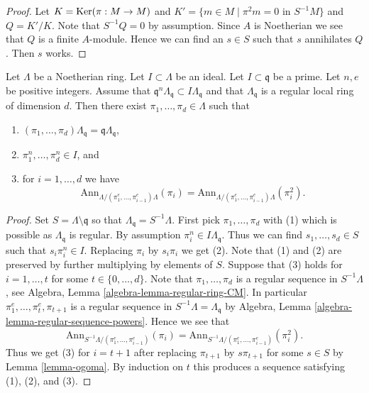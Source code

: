 \begin{proof}
Let $K = \mathop{\mathrm{Ker}}(\pi : M \to M)$ and
$K' = \{m \in M \mid \pi^2 m = 0\text{ in }S^{-1}M\}$ and
$Q = K'/K$. Note that $S^{-1}Q = 0$ by assumption. Since $A$
is Noetherian we see that $Q$ is a finite $A$-module.
Hence we can find an $s \in S$ such that $s$ annihilates $Q$.
Then $s$ works.
\end{proof}

\begin{lemma}
\label{lemma-find-sequence}
Let $\Lambda$ be a Noetherian ring. Let $I \subset \Lambda$ be an ideal.
Let $I \subset \mathfrak q$ be a prime. Let $n, e$ be positive integers.
Assume that $\mathfrak q^n\Lambda_\mathfrak q \subset I\Lambda_\mathfrak q$
and that $\Lambda_\mathfrak q$ is a regular local ring of dimension $d$.
Then there exist
$\pi_1, \ldots, \pi_d \in \Lambda$ such that
\begin{enumerate}
\item $(\pi_1, \ldots, \pi_d)\Lambda_\mathfrak q =
\mathfrak q\Lambda_\mathfrak q$,
\item $\pi_1^n, \ldots, \pi_d^n \in I$, and
\item for $i = 1, \ldots, d$ we have
$$
\text{Ann}_{\Lambda/(\pi_1^e, \ldots, \pi_{i - 1}^e)\Lambda}(\pi_i) =
\text{Ann}_{\Lambda/(\pi_1^e, \ldots, \pi_{i - 1}^e)\Lambda}(\pi_i^2).
$$
\end{enumerate}
\end{lemma}

\begin{proof}
Set $S = \Lambda \setminus \mathfrak q$ so that
$\Lambda_\mathfrak q = S^{-1}\Lambda$.
First pick $\pi_1, \ldots, \pi_d$ with (1) which is possible
as $\Lambda_\mathfrak q$ is regular. By assumption
$\pi_i^n \in I\Lambda_\mathfrak q$. Thus we can find
$s_1, \ldots, s_d \in S$ such that $s_i\pi_i^n \in I$.
Replacing $\pi_i$ by $s_i\pi_i$ we get (2).
Note that (1) and (2) are preserved by further multiplying by elements of $S$.
Suppose that (3) holds for $i = 1, \ldots, t$ for some
$t \in \{0, \ldots, d\}$. Note that
$\pi_1, \ldots, \pi_d$ is a regular sequence in $S^{-1}\Lambda$, see
Algebra, Lemma \ref{algebra-lemma-regular-ring-CM}.
In particular $\pi_1^e, \ldots, \pi_t^e, \pi_{t + 1}$ is a
regular sequence in $S^{-1}\Lambda = \Lambda_\mathfrak q$ by
Algebra, Lemma \ref{algebra-lemma-regular-sequence-powers}.
Hence we see that
$$
\text{Ann}_{S^{-1}\Lambda/(\pi_1^e, \ldots, \pi_{i - 1}^e)}(\pi_i) =
\text{Ann}_{S^{-1}\Lambda/(\pi_1^e, \ldots, \pi_{i - 1}^e)}(\pi_i^2).
$$
Thus we get (3) for $i = t + 1$ after replacing $\pi_{t + 1}$ by $s\pi_{t + 1}$
for some $s \in S$ by Lemma \ref{lemma-ogoma}. By induction on $t$ this
produces a sequence satisfying (1), (2), and (3).
\end{proof}

